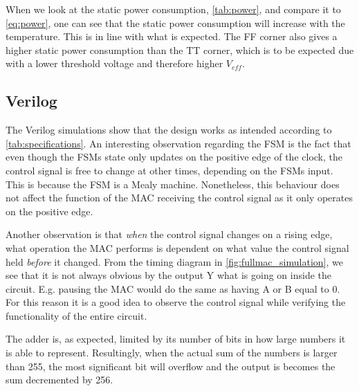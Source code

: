 When we look at the static power consumption, \autoref{tab:power}, and compare it to \autoref{eq:power}, one can see that the static power consumption will increase with the temperature. This is in line with what is expected. The FF corner also gives a higher static power consumption than the TT corner, which is to be expected due with a lower threshold voltage and therefore higher $V_{eff}$.

\subsection{Verilog}

The Verilog simulations show that the design works as intended according to \autoref{tab:specifications}.
An interesting observation regarding the FSM is the fact that even though the FSMs state only updates on the positive edge of the clock, the control signal is free to change at other times, depending on the FSMs input. This is because the FSM is a Mealy machine. Nonetheless, this behaviour does not affect the function of the MAC receiving the control signal as it only operates on the positive edge.

Another observation is that \textit{when} the control signal changes on a rising edge, what operation the MAC performs is dependent on what value the control signal held \textit{before} it changed. From the timing diagram in \autoref{fig:fullmac_simulation}, we see that it is not always obvious by the output Y what is going on inside the circuit. E.g. pausing the MAC would do the same as having A or B equal to 0. For this reason it is a good idea to observe the control signal while verifying the functionality of the entire circuit. 

The adder is, as expected, limited by its number of bits in how large numbers it is able to represent. Resultingly, when the actual sum of the numbers is larger than 255, the most significant bit will overflow and the output is becomes the sum decremented by 256.
